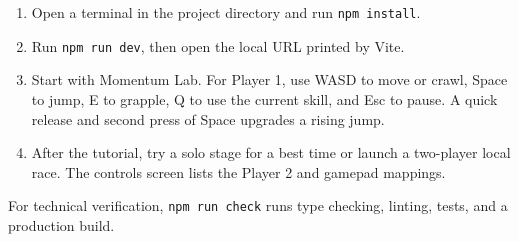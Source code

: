 \documentclass[11pt,letterpaper]{article}
\begin{document}
\begin{enumerate}
  \item Open a terminal in the project directory and run \texttt{npm install}.
  \item Run \texttt{npm run dev}, then open the local URL printed by Vite.
  \item Start with Momentum Lab. For Player 1, use WASD to move or crawl, Space to jump, E to grapple, Q to use the current skill, and Esc to pause. A quick release and second press of Space upgrades a rising jump.
  \item After the tutorial, try a solo stage for a best time or launch a two-player local race. The controls screen lists the Player 2 and gamepad mappings.
\end{enumerate}

For technical verification, \texttt{npm run check} runs type checking, linting, tests, and a production build.
\end{document}
